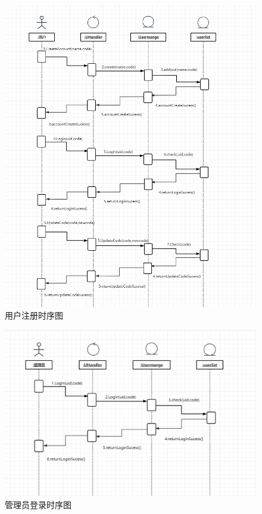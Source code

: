 \documentclass[UTF8]{ctexart}
\begin{document}
\begin{figure}[H]
  \centering
  \includegraphics[scale=0.3]{顺序图/用户登录注册.png}
  \caption{用户注册时序图}
\end{figure}

\begin{figure}[H]
  \centering
  \includegraphics[scale=0.3]{顺序图/管理员登录.png}
  \caption{管理员登录时序图}
\end{figure}
\end{document}
